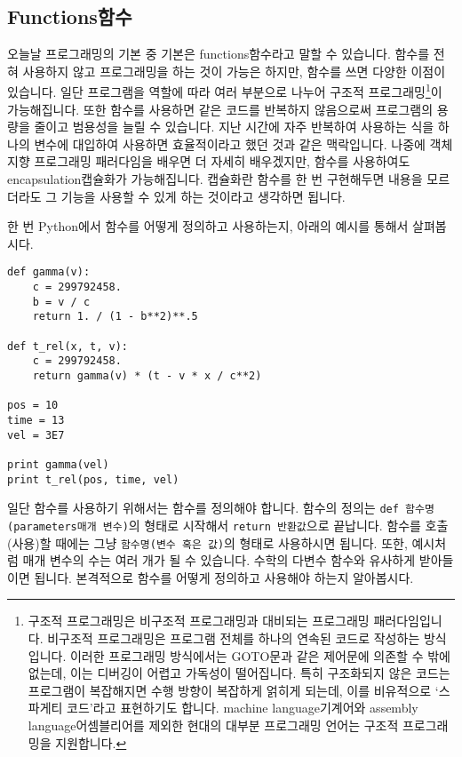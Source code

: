 \documentclass[../main.tex]{subfiles}
\begin{document}
\subsection{Functions함수}
오늘날 프로그래밍의 기본 중 기본은 functions함수라고 말할 수 있습니다.
함수를 전혀 사용하지 않고 프로그래밍을 하는 것이 가능은 하지만, 함수를 쓰면 다양한 이점이 있습니다.
일단 프로그램을 역할에 따라 여러 부분으로 나누어 구조적 프로그래밍\footnote{구조적 프로그래밍은 비구조적 프로그래밍과 대비되는 프로그래밍 패러다임입니다. 비구조적 프로그래밍은 프로그램 전체를 하나의 연속된 코드로 작성하는 방식입니다. 이러한 프로그래밍 방식에서는 GOTO문과 같은 제어문에 의존할 수 밖에 없는데, 이는 디버깅이 어렵고 가독성이 떨어집니다. 특히 구조화되지 않은 코드는 프로그램이 복잡해지면 수행 방향이 복잡하게 얽히게 되는데, 이를 비유적으로 `스파게티 코드'라고 표현하기도 합니다. machine language기계어와 assembly language어셈블리어를 제외한 현대의 대부분 프로그래밍 언어는 구조적 프로그래밍을 지원합니다.}이 가능해집니다.
또한 함수를 사용하면 같은 코드를 반복하지 않음으로써 프로그램의 용량을 줄이고 범용성을 늘릴 수 있습니다.
지난 시간에 자주 반복하여 사용하는 식을 하나의 변수에 대입하여 사용하면 효율적이라고 했던 것과 같은 맥락입니다.
나중에 객체 지향 프로그래밍 패러다임을 배우면 더 자세히 배우겠지만, 함수를 사용하여도 encapsulation캡슐화가 가능해집니다.
캡슐화란 함수를 한 번 구현해두면 내용을 모르더라도 그 기능을 사용할 수 있게 하는 것이라고 생각하면 됩니다.

한 번 Python에서 함수를 어떻게 정의하고 사용하는지, 아래의 예시를 통해서 살펴봅시다.
\begin{verbatim}
def gamma(v):
	c = 299792458.
	b = v / c
	return 1. / (1 - b**2)**.5
	
def t_rel(x, t, v):
	c = 299792458.
	return gamma(v) * (t - v * x / c**2)
	
pos = 10
time = 13
vel = 3E7

print gamma(vel)
print t_rel(pos, time, vel)
\end{verbatim}
일단 함수를 사용하기 위해서는 함수를 정의해야 합니다.
함수의 정의는 \texttt{def 함수명(parameters매개 변수)}의 형태로 시작해서 \texttt{return 반환값}으로 끝납니다.
함수를 호출(사용)할 때에는 그냥 \texttt{함수명(변수 혹은 값)}의 형태로 사용하시면 됩니다.
또한, 예시처럼 매개 변수의 수는 여러 개가 될 수 있습니다.
수학의 다변수 함수와 유사하게 받아들이면 됩니다.
본격적으로 함수를 어떻게 정의하고 사용해야 하는지 알아봅시다.
\end{document}
